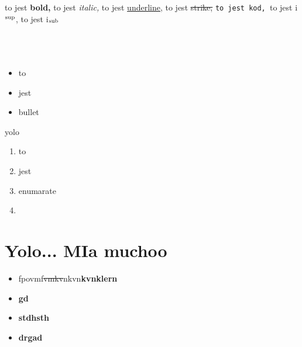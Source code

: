 \documentclass{article}
\begin{document}
to jest \textbf{bold, }to jest \textit{italic, }to jest \uline{underline,} to jest \sout{strike, }\texttt{to jest kod, }to jest i$^{\textnormal{sup}}$, to jest i$_{\textnormal{sub}}$\\\\\\\\\begin{itemize}\item to\item jest\item bullet\end{itemize}yolo\\\begin{enumerate}\item to\item jest\item enumarate\item \end{enumerate}
\section{Yolo... MIa muchoo}
\begin{itemize}\item fpovmf\sout{vmkv}nkvn\textbf{kvnklern}\item \textbf{gd}\item \textbf{stdhsth}\item \textbf{drgad}\end{itemize}
\end{document}
